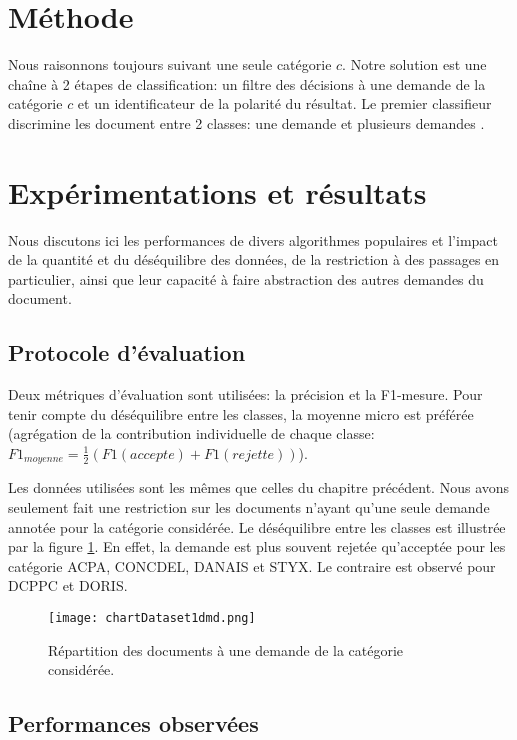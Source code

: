\section{Méthode}
Nous raisonnons toujours suivant une seule catégorie $c$. Notre solution est une chaîne à 2 étapes de classification: un filtre des décisions à une demande de la catégorie $c$ et un identificateur de la polarité du résultat. Le premier classifieur discrimine les document entre 2 classes: \og une demande \fg{} et \og plusieurs demandes \fg{}.

\section{Expérimentations et résultats}
\label{sec:sensresultat:experimentations}
Nous discutons ici les performances de divers algorithmes populaires et l'impact de la quantité et du déséquilibre des données, de la restriction à des passages en particulier, ainsi que leur capacité à faire abstraction des autres demandes du document. 

\subsection{Protocole d'évaluation}
Deux métriques d'évaluation sont utilisées: la précision et la F1-mesure. Pour tenir compte du déséquilibre entre les classes, la moyenne micro est préférée (agrégation de la contribution individuelle de chaque classe: $F1_{moyenne} = \frac{1}{2}(F1({accepte}) + F1({rejette}))$).

Les données utilisées sont les mêmes que celles du chapitre précédent. Nous avons seulement fait une restriction sur les documents n'ayant qu'une seule demande annotée pour la catégorie considérée. Le déséquilibre entre les classes est illustrée par la figure \ref{fig:sensresultat:stat-1dmd}. En effet, la demande est plus souvent rejetée qu'acceptée pour les catégorie ACPA, CONCDEL, DANAIS et STYX. Le contraire est observé pour DCPPC et DORIS.
\begin{figure}[htb]
\texttt{[image: chartDataset1dmd.png]}
\caption{Répartition des documents à une demande de la catégorie considérée.}\label{fig:sensresultat:stat-1dmd}
\end{figure}

\subsection{Performances observées}

